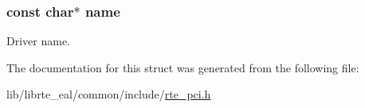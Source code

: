 \subsubsection[{name}]{\setlength{\rightskip}{0pt plus 5cm}const char$\ast$ name}\label{structrte__pci__driver_a8f8f80d37794cde9472343e4487ba3eb}
Driver name. 

The documentation for this struct was generated from the following file\+:\begin{DoxyCompactItemize}
\item 
lib/librte\+\_\+eal/common/include/\hyperlink{rte__pci_8h}{rte\+\_\+pci.\+h}\end{DoxyCompactItemize}
